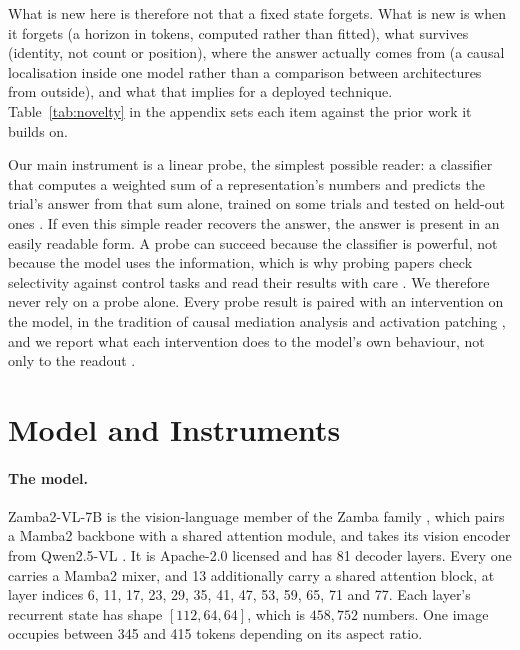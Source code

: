 \documentclass{article}
\begin{document}
What is new here is therefore not that a fixed state forgets. What is new is
when it forgets (a horizon in tokens, computed rather than fitted), what
survives (identity, not count or position), where the answer actually comes
from (a causal localisation inside one model rather than a comparison between
architectures from outside), and what that implies for a deployed technique.
Table~\ref{tab:novelty} in the appendix sets each item against the prior work
it builds on.

Our main instrument is a linear probe, the simplest possible reader: a
classifier that computes a weighted sum of a representation's numbers and
predicts the trial's answer from that sum alone, trained on some trials and
tested on held-out ones \citep{alain2016probes}. If even this simple reader
recovers the answer, the answer is present in an easily readable form. A probe can
succeed because the classifier is powerful, not because the model uses the
information, which is why probing papers check selectivity against control
tasks \citep{hewitt2019control} and read their results with care
\citep{belinkov2022probing}. We therefore never rely on a probe alone. Every
probe result is paired with an intervention on
the model, in the tradition of causal mediation analysis \citep{vig2020causal}
and activation patching \citep{meng2022rome,wang2022ioi,zhang2024patching},
and we report what each intervention does to the model's own behaviour, not
only to the readout \citep{zhang2024patching}.

\section{Model and Instruments}

\paragraph{The model.} Zamba2-VL-7B \citep{zamba2vl} is the vision-language
member of the Zamba family \citep{glorioso2024zamba}, which pairs a Mamba2
backbone \citep{dao2024mamba2} with a shared attention module, and takes its
vision encoder from Qwen2.5-VL \citep{bai2025qwen25vl}. It is Apache-2.0
licensed and has 81 decoder layers. Every one carries a Mamba2 mixer, and 13
additionally carry a shared attention block, at layer indices 6, 11, 17, 23, 29,
35, 41, 47, 53, 59, 65, 71 and 77. Each layer's recurrent state has shape
$[112, 64, 64]$, which is $458{,}752$ numbers. One image occupies between 345
and 415 tokens depending on its aspect ratio.
\end{document}
